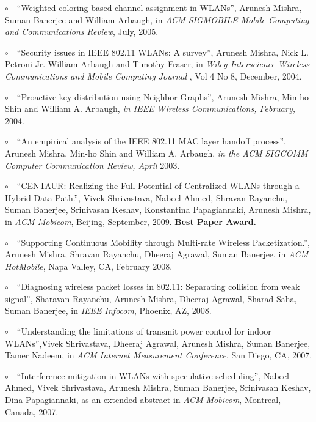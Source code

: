 \begin{resume}
\newcommand{\mybullet}{\noindent$\circ$~~}
\vspace{-0.7cm}

\mybullet ``Weighted coloring based channel assignment in WLANs'', Arunesh Mishra, Suman Banerjee and William Arbaugh,
in {\em ACM SIGMOBILE Mobile Computing and Communications Review}, July, 2005.

\mybullet ``Security issues in IEEE 802.11 WLANs: A survey'', Arunesh Mishra, Nick L. Petroni Jr. William Arbaugh and Timothy Fraser, 
in {\em  Wiley Interscience Wireless Communications and Mobile Computing Journal }, Vol 4 No 8, December, 2004.

\mybullet ``Proactive key distribution using Neighbor Graphs'', Arunesh Mishra,  Min-ho Shin and William A. Arbaugh,
{\em in IEEE Wireless Communications, February,} 2004.

\mybullet ``An empirical analysis of the IEEE 802.11 MAC layer handoff process'', Arunesh Mishra,  
Min-ho Shin and William A. Arbaugh, {\em in the ACM SIGCOMM Computer Communication Review, April} 2003. 

\vspace{-0.7cm}

\mybullet ``CENTAUR: Realizing the Full Potential of Centralized WLANs through a Hybrid Data Path.'', Vivek Shrivastava, Nabeel Ahmed, Shravan Rayanchu, Suman Banerjee, Srinivasan Keshav, Konstantina Papagiannaki, Arunesh Mishra,
in {\it ACM Mobicom}, Beijing, September, 2009. {\bf Best Paper Award.}

\mybullet ``Supporting Continuous Mobility through Multi-rate Wireless Packetization.'', Arunesh Mishra, Shravan Rayanchu, Dheeraj Agrawal, Suman Banerjee, 
in {\it ACM HotMobile}, Napa Valley, CA, February 2008.

\mybullet ``Diagnosing wireless packet losses in 802.11: Separating collision from weak signal'', Sharavan Rayanchu, Arunesh Mishra, Dheeraj Agrawal, Sharad Saha,
Suman Banerjee, in {\it IEEE Infocom}, Phoenix, AZ, 2008.

\mybullet ``Understanding the limitations of transmit power control for indoor WLANs'',Vivek Shrivastava, Dheeraj Agrawal, Arunesh Mishra, Suman Banerjee, Tamer
  Nadeem, in {\it ACM Internet Measurement Conference}, San Diego, CA, 2007.

\mybullet ``Interference mitigation in WLANs with speculative scheduling'', Nabeel Ahmed, Vivek Shrivastava, Arunesh Mishra,
   Suman Banerjee, Srinivasan Keshav, Dina Papagiannaki, as an extended
   abstract  in  {\it ACM Mobicom}, Montreal, Canada, 2007.


\end{resume}
